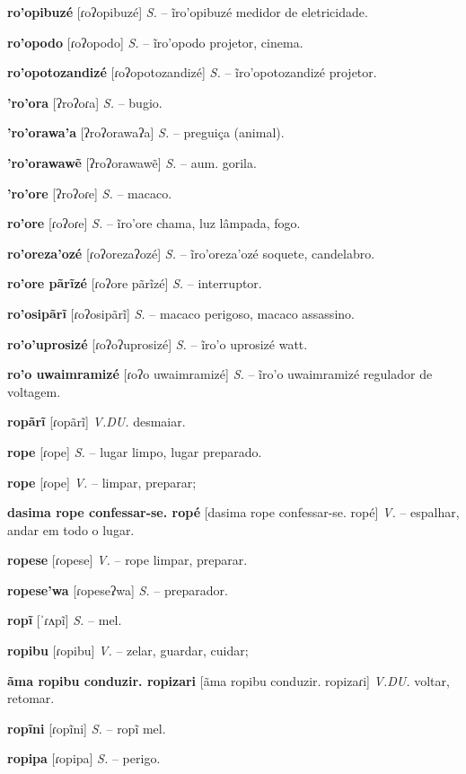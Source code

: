 \textbf{ro'opibuzé} [ɾoʔopibuzé] \textit{S.} -- ĩro'opibuzé medidor de eletricidade.

\textbf{ro'opodo} [ɾoʔopodo] \textit{S.} -- ĩro'opodo projetor, cinema.

\textbf{ro'opotozandizé} [ɾoʔopotozandizé] \textit{S.} -- ĩro'opotozandizé projetor.

\textbf{'ro'ora} [ʔroʔoɾa] \textit{S.} -- bugio.

\textbf{'ro'orawa'a} [ʔroʔorawaʔa] \textit{S.} -- preguiça (animal).

\textbf{'ro'orawawẽ} [ʔroʔorawawẽ] \textit{S.} -- aum. gorila.

\textbf{'ro'ore} [ʔroʔoɾe] \textit{S.} -- macaco.

\textbf{ro'ore} [ɾoʔoɾe] \textit{S.} -- ĩro'ore chama, luz lâmpada, fogo.

\textbf{ro'oreza'ozé} [ɾoʔorezaʔozé] \textit{S.} -- ĩro'oreza'ozé soquete, candelabro.

\textbf{ro'ore pãrĩzé} [ɾoʔore pãrĩzé] \textit{S.} -- interruptor.

\textbf{ro'osipãrĩ} [ɾoʔosipãrĩ] \textit{S.} -- macaco perigoso, macaco assassino.

\textbf{ro'o'uprosizé} [ɾoʔoʔuprosizé] \textit{S.} -- ĩro'o uprosizé watt.

\textbf{ro'o uwaimramizé} [ɾoʔo uwaimramizé] \textit{S.} -- ĩro'o uwaimramizé regulador de voltagem.

\textbf{ropãrĩ} [ɾopãrĩ] \textit{V.DU.} desmaiar.

\textbf{rope} [ɾope] \textit{S.} -- lugar limpo, lugar preparado.

\textbf{rope} [ɾope] \textit{V.} -- limpar, preparar;

\textbf{dasima rope confessar-se. ropé} [dasima rope confessar-se. ropé] \textit{V.} -- espalhar, andar em todo o lugar.

\textbf{ropese} [ɾopese] \textit{V.} -- rope limpar, preparar.

\textbf{ropese'wa} [ɾopeseʔwa] \textit{S.} -- preparador.

\textbf{ropĩ} [ˈɾʌpĩ] \textit{S.} -- mel.

\textbf{ropibu} [ɾopibu] \textit{V.} -- zelar, guardar, cuidar;

\textbf{ãma ropibu conduzir. ropizari} [ãma ropibu conduzir. ropizaɾi] \textit{V.DU.} voltar, retomar.

\textbf{ropĩni} [ɾopĩni] \textit{S.} -- ropĩ mel.

\textbf{ropipa} [ɾopipa] \textit{S.} -- perigo.

